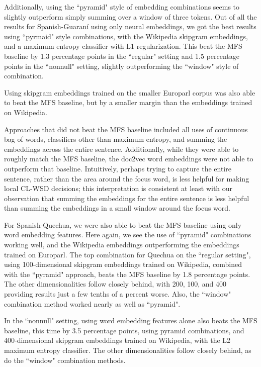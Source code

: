 Additionally, using the ``pyramid" style of embedding combinations seems to
slightly outperform simply summing over a window of three tokens. Out of all
the results for Spanish-Guaraní using only neural embeddings, we got the best
results using ``pyrmaid" style combinations, with the Wikipedia skipgram
embeddings, and a maximum entropy classifier with L1 regularization. This beat
the MFS baseline by 1.3 percentage points in the ``regular" setting and 1.5
percentage points in the ``nonnull" setting, slightly outperforming the
``window" style of combination.

Using skipgram embeddings trained on the smaller Europarl corpus was also able
to beat the MFS baseline, but by a smaller margin than the embeddings trained
on Wikipedia.

Approaches that did not beat the MFS baseline included all uses of continuous
bag of words, classifiers other than maximum entropy, and summing the
embeddings across the entire sentence. Additionally, while they were able to
roughly match the MFS baseline, the doc2vec word embeddings were not able to
outperform that baseline. Intuitively, perhaps trying to capture the entire
sentence, rather than the area around the focus word, is less helpful for
making local CL-WSD decisions; this interpretation is consistent at least with
our observation that summing the embeddings for the entire sentence is less
helpful than summing the embeddings in a small window around the focus word.

For Spanish-Quechua, we were also able to beat the MFS baseline using only word
embedding features. Here again, we see the use of ``pyramid" combinations
working well, and the Wikipedia embeddings outperforming the embeddings trained
on Europarl. The top combination for Quechua on the ``regular setting", using
100-dimensional skipgram embeddings trained on Wikipedia, combined with the
``pyramid" approach, beats the MFS baseline by 1.8 percentage points. The other
dimensionalities follow closely behind, with 200, 100, and 400 providing
results just a few tenths of a percent worse. Also, the ``window" combination
method worked nearly as well as ``pyramid".

In the ``nonnull" setting, using word embedding features alone also beats the
MFS baseline, this time by 3.5 percentage points, using pyramid combinations,
and 400-dimensional skipgram embeddings trained on Wikipedia, with the L2
maximum entropy classifier. The other dimensionalities follow closely behind,
as do the ``window" combination methods.

